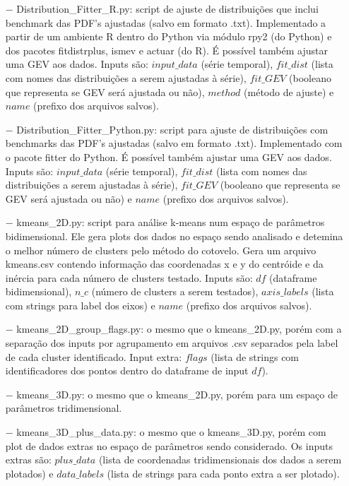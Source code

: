 \begin{itemize}
\begin{itemize}
\item[$-$] Distribution\_Fitter\_R.py: script de ajuste de distribuições que inclui benchmark das PDF's ajustadas (salvo em formato .txt). Implementado a partir de um ambiente R dentro do Python via módulo rpy2 (do Python) e dos pacotes fitdistrplus, ismev e actuar (do R). É possível também ajustar uma GEV aos dados. Inputs são: $input\_data$ (série temporal), $fit\_dist$ (lista com nomes das distribuições a serem ajustadas à série), $fit\_GEV$ (booleano que representa se GEV será ajustada ou não), $method$ (método de ajuste) e $name$ (prefixo dos arquivos salvos).

\item[$-$] Distribution\_Fitter\_Python.py: script para ajuste de distribuições com benchmarks das PDF's ajustadas (salvo em formato .txt). Implementado com o pacote fitter do Python. É possível também ajustar uma GEV aos dados. Inputs são: $input\_data$ (série temporal), $fit\_dist$ (lista com nomes das distribuições a serem ajustadas à série), $fit\_GEV$ (booleano que representa se GEV será ajustada ou não) e $name$ (prefixo dos arquivos salvos).

\item[$-$] kmeans\_2D.py: script para análise k-means num espaço de parâmetros bidimensional. Ele gera plots dos dados no espaço sendo analisado e detemina o melhor número de clusters pelo método do cotovelo. Gera um arquivo kmeans.csv contendo informação das coordenadas x e y do centróide e da inércia para cada número de clusters testado. Inputs são: $df$ (dataframe bidimensional), $n\_c$ (número de clusters a serem testados), $axis\_labels$ (lista com strings para label dos eixos) e $name$ (prefixo dos arquivos salvos).

\item[$-$] kmeans\_2D\_group\_flags.py: o mesmo que o kmeans\_2D.py, porém com a separação dos inputs por agrupamento em arquivos .csv separados pela label de cada cluster identificado. Input extra: $flags$ (lista de strings com identificadores dos pontos dentro do dataframe de input $df$).

\item[$-$] kmeans\_3D.py: o mesmo que o kmeans\_2D.py, porém para um espaço de parâmetros tridimensional.

\item[$-$] kmeans\_3D\_plus\_data.py: o mesmo que o kmeans\_3D.py, porém com plot de dados extras no espaço de parâmetros sendo considerado. Os inputs extras são: $plus\_data$ (lista de coordenadas tridimensionais dos dados a serem plotados) e $data\_labels$ (lista de strings para cada ponto extra a ser plotado).


\end{itemize}
\end{itemize}
